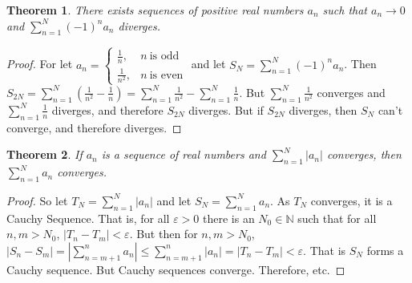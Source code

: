 \documentclass[oneside]{book}
\theoremstyle{mystyle}
\newtheorem*{theorem*}{Theorem}
\begin{document}
\begin{theorem*}
There exists sequences of positive real numbers $a_n$ such that $a_n \rightarrow 0$ and $\sum_{n=1}^{N}(-1)^n a_n$ diverges.
\end{theorem*}
\begin{proof}
For let $a_{n} = \begin{cases} \frac{1}{n}, & n\ \textrm{is odd}\\ \frac{1}{n^2} , & n\ \textrm{is even}\end{cases}$ and let $S_N = \sum_{n=1}^{N}(-1)^{n}a_n$. Then $S_{2N} = \sum_{n=1}^{N} (\frac{1}{n^2} - \frac{1}{n}) = \sum_{n=1}^{N}\frac{1}{n^2} - \sum_{n=1}^{N}\frac{1}{n}$. But $\sum_{n=1}^{N} \frac{1}{n^2}$ converges and $\sum_{n=1}^{N}\frac{1}{n}$ diverges, and therefore $S_{2N}$ diverges. But if $S_{2N}$ diverges, then $S_{N}$ can't converge, and therefore diverges.
\end{proof}

\begin{theorem*}
If $a_n$ is a sequence of real numbers and $\sum_{n=1}^{N}|a_n|$ converges, then $\sum_{n=1}^{N}a_n$ converges.
\end{theorem*}
\begin{proof}
So let $T_{N} = \sum_{n=1}^{N}|a_n|$ and let $S_{N} = \sum_{n=1}^{N}a_{n}$. As $T_{N}$ converges, it is a Cauchy Sequence. That is, for all $\varepsilon>0$ there is an $N_0 \in \mathbb{N}$ such that for all $n,m>N_{0}$, $|T_{n} - T_{m}|<\varepsilon$. But then for $n,m>N_{0}$, $|S_{n} - S_{m}| = |\sum_{n=m+1}^{n}a_n| \leq \sum_{n=m+1}^{n}|a_n| = |T_{n} - T_{m}| <\varepsilon$. That is $S_{N}$ forms a Cauchy sequence. But Cauchy sequences converge. Therefore, etc.
\end{proof}
%
\end{document}
